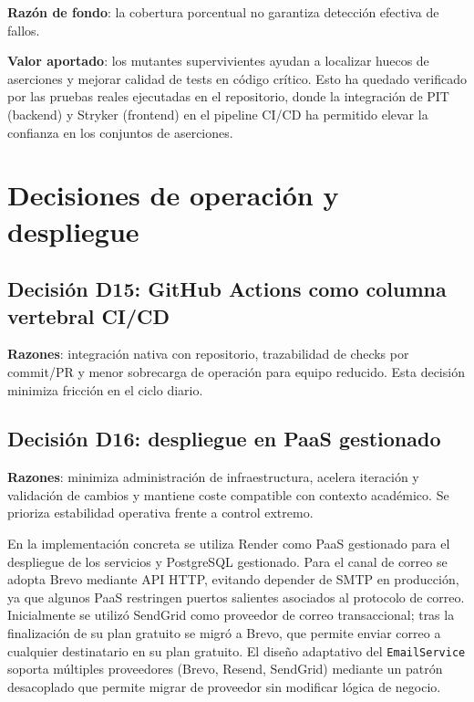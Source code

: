 \textbf{Raz\'on de fondo}:
la cobertura porcentual no garantiza detecci\'on efectiva de fallos.

\textbf{Valor aportado}:
los mutantes supervivientes ayudan a localizar huecos de aserciones y mejorar calidad de tests en c\'odigo cr\'itico. Esto ha quedado verificado por las pruebas reales ejecutadas en el repositorio, donde la integraci\'on de PIT (backend) y Stryker (frontend) en el pipeline CI/CD ha permitido elevar la confianza en los conjuntos de aserciones.

\FloatBarrier
\section{Decisiones de operaci\'on y despliegue}

\subsection{Decisi\'on D15: GitHub Actions como columna vertebral CI/CD}

\textbf{Razones}: integraci\'on nativa con repositorio, trazabilidad de checks por commit/PR y menor sobrecarga de operaci\'on para equipo reducido. Esta decisi\'on minimiza fricci\'on en el ciclo diario.

\subsection{Decisi\'on D16: despliegue en PaaS gestionado}

\textbf{Razones}: minimiza administraci\'on de infraestructura, acelera iteraci\'on y validaci\'on de cambios y mantiene coste compatible con contexto acad\'emico. Se prioriza estabilidad operativa frente a control extremo.

En la implementaci\'on concreta se utiliza Render como PaaS gestionado para
el despliegue de los servicios y PostgreSQL gestionado. Para el canal de
correo se adopta Brevo mediante API HTTP, evitando depender de SMTP en
producci\'on, ya que algunos PaaS restringen puertos salientes asociados al
protocolo de correo. Inicialmente se utiliz\'o SendGrid como proveedor
de correo transaccional; tras la finalizaci\'on de su plan gratuito
se migr\'o a Brevo, que permite enviar correo a cualquier destinatario
en su plan gratuito.
El dise\~no adaptativo del \texttt{EmailService} soporta m\'ultiples
proveedores (Brevo, Resend, SendGrid) mediante un patr\'on desacoplado
que permite migrar de proveedor sin modificar l\'ogica de negocio.

